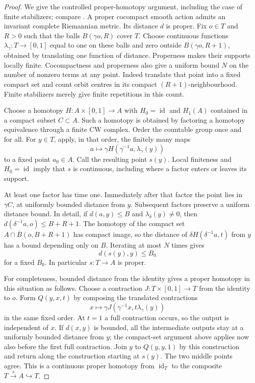 \begin{proof}
We give the controlled proper-homotopy argument, including the case of finite stabilizers; compare \cite[\S1, Lemmas~11--12 and Proposition~13]{KollarPardon2012}.  A proper cocompact smooth action admits an invariant complete Riemannian metric.  Its distance $d$ is proper.  Fix $o\in T$ and $R>0$ such that the balls $B(\gamma o,R)$ cover $T$.  Choose continuous functions $\lambda_\gamma:T\to[0,1]$ equal to one on these balls and zero outside $B(\gamma o,R+1)$, obtained by translating one function of distance.  Properness makes their supports locally finite.  Cocompactness and properness also give a uniform bound $N$ on the number of nonzero terms at any point. Indeed translate that point into a fixed compact set and count orbit centres in its compact $(R+1)$-neighbourhood.  Finite stabilizers merely give finite repetitions in this count.

Choose a homotopy $H:A\times[0,1]\to A$ with $H_0=\operatorname{id}$ and $H_1(A)$ contained in a compact subset $C\subset A$.  Such a homotopy is obtained by factoring a homotopy equivalence through a finite CW complex.  Order the countable group once and for all. For $y\in T$, apply, in that order, the finitely many maps
\[
       a\longmapsto\gamma H(\gamma^{-1}a,\lambda_\gamma(y))
\]
to a fixed point $a_0\in A$.  Call the resulting point $s(y)$. Local finiteness and $H_0=\operatorname{id}$ imply that $s$ is continuous, including where a factor enters or leaves its support.

At least one factor has time one.  Immediately after that factor the point lies in $\gamma C$, at uniformly bounded distance from $y$. Subsequent factors preserve a uniform distance bound.  In detail, if $d(a,y)\le B$ and $\lambda_\delta(y)\ne0$, then $d(\delta^{-1}a,o)\le B+R+1$.  The homotopy of the compact set $A\cap\overline B(o,B+R+1)$ has compact image, so the distance of $\delta H(\delta^{-1}a,t)$ from $y$ has a bound depending only on $B$.  Iterating at most $N$ times gives
\[
                        d(s(y),y)\le B_0
\]
for a fixed $B_0$.  In particular $s:T\to A$ is proper.

For completeness, bounded distance from the identity gives a proper homotopy in this situation as follows.  Choose a contraction $J:T\times[0,1]\to T$ from the identity to $o$.  Form $Q(y,x,t)$ by composing the translated contractions
\[
       x\longmapsto\gamma J(\gamma^{-1}x,t\lambda_\gamma(y))
\]
in the same fixed order.  At $t=1$ a full contraction occurs, so the output is independent of $x$.  If $d(x,y)$ is bounded, all the intermediate outputs stay at a uniformly bounded distance from $y$; the compact-set argument above applies now also before the first full contraction.  Join $y$ to $Q(y,y,1)$ by this construction and return along the construction starting at $s(y)$.  The two middle points agree.  This is a continuous proper homotopy from $\operatorname{id}_T$ to the composite $T\xrightarrow{s}A\hookrightarrow T$.


\end{proof}
